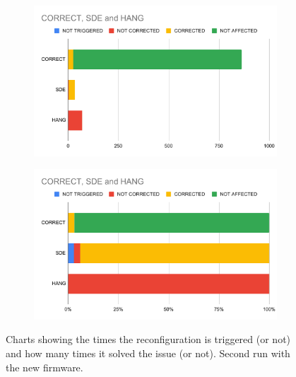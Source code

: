 \begin{figure}[H]
  \centering
  \begin{minipage}[t]{.49\linewidth}
  \begin{figure}[H]
  \centering
    \includegraphics[width=\linewidth]{images/chapter5/csh3.pdf}
  \end{figure}
  \end{minipage}
  \hfill
  \begin{minipage}[t]{.49\linewidth}
  \begin{figure}[H]
	\centering
    \includegraphics[width=\linewidth]{images/chapter5/csh4.pdf}
  \end{figure}
  \end{minipage}
  \caption{Charts showing the times the reconfiguration is triggered (or not) and how many times it solved the issue (or not). Second run with the new firmware.}
\end{figure}
